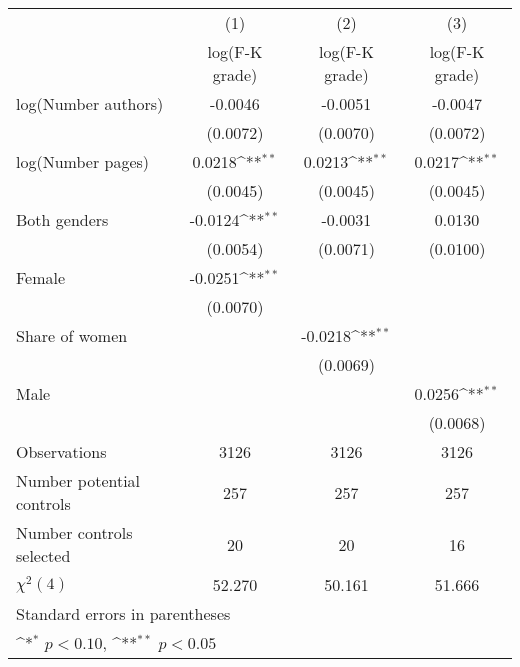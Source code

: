 {
\def\sym#1{\ifmmode^{#1}\else\(^{#1}\)\fi}
\begin{tabular}{l*{3}{c}}
\hline\hline
                    &\multicolumn{1}{c}{(1)}&\multicolumn{1}{c}{(2)}&\multicolumn{1}{c}{(3)}\\
                    &\multicolumn{1}{c}{log(F-K grade)}&\multicolumn{1}{c}{log(F-K grade)}&\multicolumn{1}{c}{log(F-K grade)}\\
\hline
\hspace{3mm}log(Number authors)&     -0.0046        &     -0.0051        &     -0.0047        \\
                    &    (0.0072)        &    (0.0070)        &    (0.0072)        \\
[1em]
\hspace{3mm}log(Number pages)&      0.0218\sym{**}&      0.0213\sym{**}&      0.0217\sym{**}\\
                    &    (0.0045)        &    (0.0045)        &    (0.0045)        \\
[1em]
\hspace{3mm}Both genders&     -0.0124\sym{**}&     -0.0031        &      0.0130        \\
                    &    (0.0054)        &    (0.0071)        &    (0.0100)        \\
[1em]
\hspace{3mm}Female  &     -0.0251\sym{**}&                    &                    \\
                    &    (0.0070)        &                    &                    \\
[1em]
\hspace{3mm}Share of women&                    &     -0.0218\sym{**}&                    \\
                    &                    &    (0.0069)        &                    \\
[1em]
\hspace{3mm}Male    &                    &                    &      0.0256\sym{**}\\
                    &                    &                    &    (0.0068)        \\
\hline
Observations        &        3126        &        3126        &        3126        \\
Number potential controls&         257        &         257        &         257        \\
Number controls selected&          20        &          20        &          16        \\
$\chi^2(4)$         &      52.270        &      50.161        &      51.666        \\
\hline\hline
\multicolumn{4}{l}{\footnotesize Standard errors in parentheses}\\
\multicolumn{4}{l}{\footnotesize \sym{*} \(p<0.10\), \sym{**} \(p<0.05\)}\\
\end{tabular}
}
